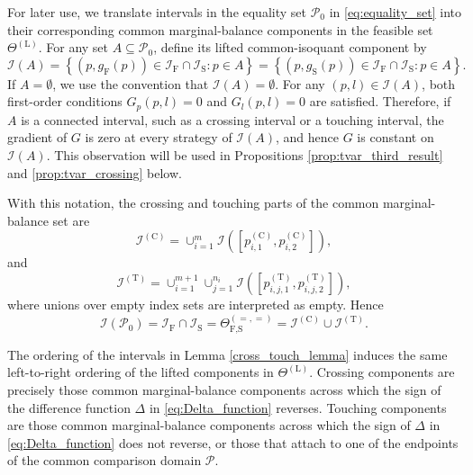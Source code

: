 \documentclass[a4paper,12pt]{article}
\begin{document}
For later use, we translate intervals in the equality set $\mathcal{P}_0$ in \eqref{eq:equality_set} into their corresponding common marginal-balance components in the feasible set $\Theta^{\left(\text{L}\right)}$. For any set $A\subseteq\mathcal{P}_0$, define its lifted common-isoquant component by
\begin{equation*}
\mathcal{I}\left(A\right)=\left\{\left(p,g_{\text{F}}\left(p\right)\right)\in\mathcal{I}_{\text{F}}\cap\mathcal{I}_{\text{S}}:p\in A\right\}=\left\{\left(p,g_{\text{S}}\left(p\right)\right)\in\mathcal{I}_{\text{F}}\cap\mathcal{I}_{\text{S}}:p\in A\right\}.
\end{equation*}
If $A=\emptyset$, we use the convention that $\mathcal{I}\left(A\right)=\emptyset$. For any $\left(p,l\right)\in\mathcal{I}\left(A\right)$, both first-order conditions $G_p\left(p,l\right)=0$ and $G_l\left(p,l\right)=0$ are satisfied. Therefore, if $A$ is a connected interval, such as a crossing interval or a touching interval, the gradient of $G$ is zero at every strategy of $\mathcal{I}\left(A\right)$, and hence $G$ is constant on $\mathcal{I}\left(A\right)$. This observation will be used in Propositions \ref{prop:tvar_third_result} and \ref{prop:tvar_crossing} below.

With this notation, the crossing and touching parts of the common marginal-balance set are
\begin{equation*}
\mathcal{I}^{\left(\text{C}\right)}=\cup_{i=1}^{m}\mathcal{I}\left(\left[p^{\left(\text{C}\right)}_{i,1},p^{\left(\text{C}\right)}_{i,2}\right]\right),
\end{equation*}
and
\begin{equation*}
\mathcal{I}^{\left(\text{T}\right)}=\cup_{i=1}^{m+1}\cup_{j=1}^{n_i}\mathcal{I}\left(\left[p^{\left(\text{T}\right)}_{i,j,1},p^{\left(\text{T}\right)}_{i,j,2}\right]\right),
\end{equation*}
where unions over empty index sets are interpreted as empty. Hence
\begin{equation*}
\mathcal{I}\left(\mathcal{P}_0\right)=\mathcal{I}_{\text{F}}\cap\mathcal{I}_{\text{S}}=\Theta_{\text{F,S}}^{\left(=,=\right)}=\mathcal{I}^{\left(\text{C}\right)}\cup\mathcal{I}^{\left(\text{T}\right)}.
\end{equation*}

The ordering of the intervals in Lemma \ref{cross_touch_lemma} induces the same left-to-right ordering of the lifted components in $\Theta^{\left(\text{L}\right)}$. Crossing components are precisely those common marginal-balance components across which the sign of the difference function $\Delta$ in \eqref{eq:Delta_function} reverses. Touching components are those common marginal-balance components across which the sign of $\Delta$ in \eqref{eq:Delta_function} does not reverse, or those that attach to one of the endpoints of the common comparison domain $\mathcal{P}$.
\end{document}
